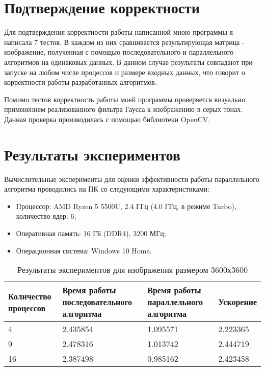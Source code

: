 \documentclass{report}
\begin{document}
\newpage

\section*{Подтверждение корректности}
Для подтверждения корректности работы написанной мною программы я написала 7 тестов. В каждом из них сравнивается результирующая матрица - изображение, полученная с помощью последовательного и параллельного алгоритмов на одинаковых данных. В данном случае результаты совпадают при запуске на любом числе процессов и размере входных данных, что говорит о корректности работы разработанных алгоритмов. 
\par Помимо тестов корректность работы моей программы проверяется визуально применением реализованного фильтра Гаусса к изображению в серых тонах. Данная проверка производилась с помощью библиотеки OpenCV.

\newpage

\section*{Результаты экспериментов}
Вычислительные эксперименты для оценки эффективности работы параллельного алгоритма проводились на ПК со следующими характеристиками:
\begin{itemize}
\item Процессор: AMD Ryzen 5 5500U, 2.4 ГГц (4.0 ГГц, в режиме Turbo), количество ядер: 6;
\item Оперативная память: 16 ГБ (DDR4), 3200 МГц;
\item Операционная система: Windows 10 Home.
\end{itemize}

\begin{table}[!h]
\caption{Результаты экспериментов для изображения размером 3600х3600}
\centering
\begin{tabular}{| p{2cm} | p{3cm} | p{4cm} | p{2cm} |}
\hline
Количество процессов & Время работы последовательного алгоритма & Время работы параллельного алгоритма & Ускорение  \\[5pt]
\hline
4        & 2.435854        & 1.095571     & 2.223365       \\
9        & 2.478316        & 1.013742     & 2.444719       \\
16       & 2.387498        & 0.985162     & 2.423458	   \\
\hline
\end{tabular}
\end{table}
\end{document}
